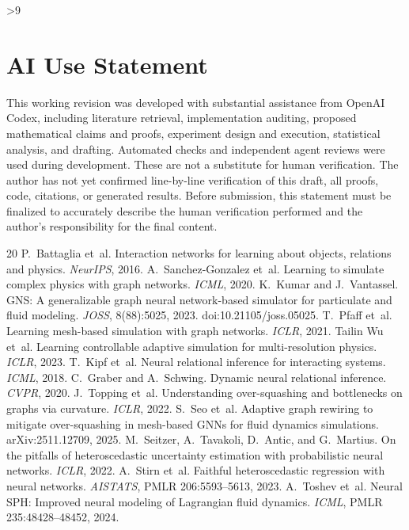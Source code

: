 \clearpage
{}
\ifnum\value{page}>9
  \PackageError{research-revision}{Main text exceeds the eight-page limit}{Shorten the main text before submission.}
\fi
\section*{AI Use Statement}
This working revision was developed with substantial assistance from OpenAI Codex, including literature retrieval, implementation auditing, proposed mathematical claims and proofs, experiment design and execution, statistical analysis, and drafting. Automated checks and independent agent reviews were used during development. These are not a substitute for human verification. The author has not yet confirmed line-by-line verification of this draft, all proofs, code, citations, or generated results. Before submission, this statement must be finalized to accurately describe the human verification performed and the author's responsibility for the final content.

\begin{thebibliography}{20}
 P.~Battaglia et~al. Interaction networks for learning about objects, relations and physics. \emph{NeurIPS}, 2016.
 A.~Sanchez-Gonzalez et~al. Learning to simulate complex physics with graph networks. \emph{ICML}, 2020.
 K.~Kumar and J.~Vantassel. GNS: A generalizable graph neural network-based simulator for particulate and fluid modeling. \emph{JOSS}, 8(88):5025, 2023. doi:10.21105/joss.05025.
 T.~Pfaff et~al. Learning mesh-based simulation with graph networks. \emph{ICLR}, 2021.
 Tailin Wu et~al. Learning controllable adaptive simulation for multi-resolution physics. \emph{ICLR}, 2023.
 T.~Kipf et~al. Neural relational inference for interacting systems. \emph{ICML}, 2018.
 C.~Graber and A.~Schwing. Dynamic neural relational inference. \emph{CVPR}, 2020.
 J.~Topping et~al. Understanding over-squashing and bottlenecks on graphs via curvature. \emph{ICLR}, 2022.
 S.~Seo et~al. Adaptive graph rewiring to mitigate over-squashing in mesh-based GNNs for fluid dynamics simulations. arXiv:2511.12709, 2025.
 M.~Seitzer, A.~Tavakoli, D.~Antic, and G.~Martius. On the pitfalls of heteroscedastic uncertainty estimation with probabilistic neural networks. \emph{ICLR}, 2022.
 A.~Stirn et~al. Faithful heteroscedastic regression with neural networks. \emph{AISTATS}, PMLR 206:5593--5613, 2023.
 A.~Toshev et~al. Neural SPH: Improved neural modeling of Lagrangian fluid dynamics. \emph{ICML}, PMLR 235:48428--48452, 2024.
\end{thebibliography}

